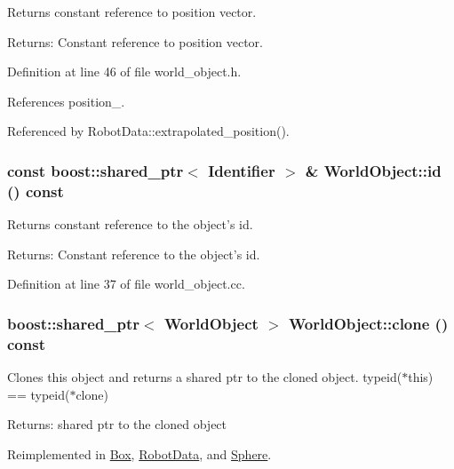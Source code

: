Returns constant reference to position vector. \begin{Desc}
\item[Returns:]Constant reference to position vector. \end{Desc}


Definition at line 46 of file world\_\-object.h.

References position\_\-.

Referenced by RobotData::extrapolated\_\-position().\hypertarget{class_world_object_86cb6d16f21d52ebe8f9dc48e9e762f3}{
\subsubsection[id]{\setlength{\rightskip}{0pt plus 5cm}const boost::shared\_\-ptr$<$ {\bf Identifier} $>$ \& WorldObject::id () const}}
\label{class_world_object_86cb6d16f21d52ebe8f9dc48e9e762f3}


Returns constant reference to the object's id. \begin{Desc}
\item[Returns:]Constant reference to the object's id. \end{Desc}


Definition at line 37 of file world\_\-object.cc.\hypertarget{class_world_object_dba468299ce77ce5781e60081bf44b14}{
\subsubsection[clone]{\setlength{\rightskip}{0pt plus 5cm}boost::shared\_\-ptr$<$ {\bf WorldObject} $>$ WorldObject::clone () const}}
\label{class_world_object_dba468299ce77ce5781e60081bf44b14}


Clones this object and returns a shared ptr to the cloned object. typeid($\ast$this) == typeid($\ast$clone) \begin{Desc}
\item[Returns:]shared ptr to the cloned object \end{Desc}


Reimplemented in \hyperlink{class_box_06c27f9a07a6ba9e87aa0c2e57237b5c}{Box}, \hyperlink{class_robot_data_81b5c3ba1f959f41ff3a9cb8067d75cb}{RobotData}, and \hyperlink{class_sphere_6fcc846dbbef396057b572b9a0786cdc}{Sphere}.

